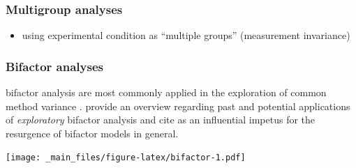 \documentclass[
]{book}
\providecommand{\tightlist}{%
  \setlength{\itemsep}{0pt}\setlength{\parskip}{0pt}}
\begin{document}
\hypertarget{multigroup-analyses}{%
\subsubsection{Multigroup analyses}\label{multigroup-analyses}}

\begin{itemize}
\tightlist
\item
  using experimental condition as ``multiple groups'' (measurement invariance)
\end{itemize}

\hypertarget{bifactor-analyses}{%
\subsubsection{Bifactor analyses}\label{bifactor-analyses}}

bifactor analysis are most commonly applied in the exploration of common method variance \citep[see, for example,][]{reise_rediscovery_2012, rodriguez_evaluating_2016}. \citet{giordano_exploratory_2020} provide an overview regarding past and potential applications of \emph{exploratory} bifactor analysis and cite \citet{reise_rediscovery_2012} as an influential impetus for the resurgence of bifactor models in general.

\texttt{[image: \_main\_files/figure-latex/bifactor-1.pdf]}
\end{document}
